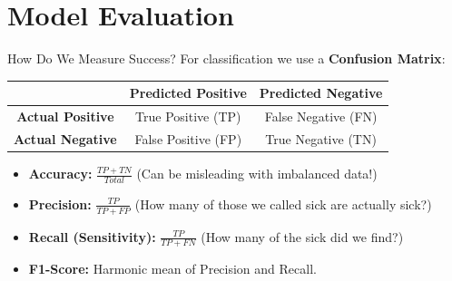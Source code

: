 \documentclass[aspectratio=169]{beamer}
\begin{document}
\section{Model Evaluation}
\begin{frame}{How Do We Measure Success?}
    For classification we use a \textbf{Confusion Matrix}:
    
    \begin{table}[]
        \centering
        \begin{tabular}{|c|c|c|}
            \hline
             & \textbf{Predicted Positive} & \textbf{Predicted Negative} \\ \hline
            \textbf{Actual Positive} & True Positive (TP) & False Negative (FN) \\ \hline
            \textbf{Actual Negative} & False Positive (FP) & True Negative (TN) \\ \hline
        \end{tabular}
    \end{table}
    
    \vspace{0.2cm}
    \begin{itemize}
        \item \textbf{Accuracy:} $\frac{TP + TN}{Total}$ (Can be misleading with imbalanced data!)
        \item \textbf{Precision:} $\frac{TP}{TP + FP}$ (How many of those we called sick are actually sick?)
        \item \textbf{Recall (Sensitivity):} $\frac{TP}{TP + FN}$ (How many of the sick did we find?)
        \item \textbf{F1-Score:} Harmonic mean of Precision and Recall.
    \end{itemize}
\end{frame}
\end{document}
